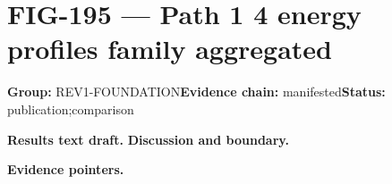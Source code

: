 \clearpage
\section{FIG-195 --- Path 1 4 energy profiles family aggregated}
\label{figpage:fig-195}
\textbf{Group:} REV1-FOUNDATION\quad \textbf{Evidence chain:} manifested\quad \textbf{Status:} publication;comparison

\textbf{Results text draft.} 
\textbf{Discussion and boundary.} 


\textbf{Evidence pointers.}



\vfill
